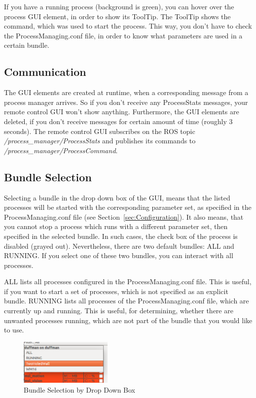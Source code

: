 If you have a running process (background is green), you can hover over the process GUI element, in order to show its ToolTip. The ToolTip shows the command, which was used to start the process. This way, you don't have to check the ProcessManaging.conf file, in order to know what parameters are used in a certain bundle.


\subsection*{Communication}

The GUI elements are created at runtime, when a corresponding message from a process manager arrives. So if you don't receive any ProcessStats messages, your remote control GUI won't show anything. Furthermore, the GUI elements are deleted, if you don't receive messages for certain amount of time (roughly 3 seconds). The remote control GUI subscribes on the ROS topic \emph{/process\_manager/ProcessStats} and publishes its commands to \emph{/process\_manager/ProcessCommand}.

\subsection*{Bundle Selection}
\label{ssec:BundleSelection}

Selecting a bundle in the drop down box of the GUI, means that the listed processes will be started with the corresponding parameter set, as specified in the ProcessManaging.conf file (see Section~\ref{sec:Configuration}). It also means, that you cannot stop a process which runs with a different parameter set, then specified in the selected bundle. In such cases, the check box of the process is disabled (grayed out). Nevertheless, there are two default bundles: ALL and RUNNING. If you select one of these two bundles, you can interact with all processes.

ALL lists all processes configured in the ProcessManaging.conf file. This is useful, if you want to start a set of processes, which is not specified as an explicit bundle. RUNNING lists all processes of the ProcessManaging.conf file, which are currently up and running. This is useful, for determining, whether there are unwanted processes running, which are not part of the bundle that you would like to use.

\begin{figure}[htbp]
 \centering
 \includegraphics[width=0.4\textwidth]{img/ProcManBundleSelection.png}
 \caption{Bundle Selection by Drop Down Box}
 \label{fig:ProcManBundleSelection}
\end{figure}

